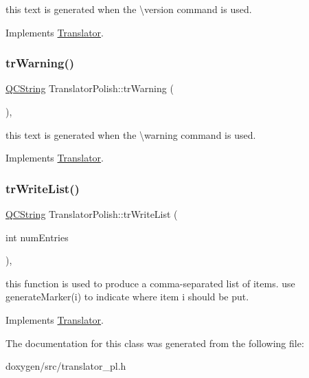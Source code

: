this text is generated when the \textbackslash{}version command is used. 

Implements \mbox{\hyperlink{class_translator}{Translator}}.

\mbox{\label{class_translator_polish_ac2c102476e3c367afb549e97883f5df1}} 
\subsubsection{\texorpdfstring{trWarning()}{trWarning()}}
{\footnotesize\ttfamily \mbox{\hyperlink{class_q_c_string}{Q\+C\+String}} Translator\+Polish\+::tr\+Warning (\begin{DoxyParamCaption}{ }\end{DoxyParamCaption})\hspace{0.3cm}{\ttfamily [inline]}, {\ttfamily [virtual]}}

this text is generated when the \textbackslash{}warning command is used. 

Implements \mbox{\hyperlink{class_translator}{Translator}}.

\mbox{\label{class_translator_polish_ac620731bc7c549f184826d9e558db0aa}} 
\subsubsection{\texorpdfstring{trWriteList()}{trWriteList()}}
{\footnotesize\ttfamily \mbox{\hyperlink{class_q_c_string}{Q\+C\+String}} Translator\+Polish\+::tr\+Write\+List (\begin{DoxyParamCaption}\item[{int}]{num\+Entries }\end{DoxyParamCaption})\hspace{0.3cm}{\ttfamily [inline]}, {\ttfamily [virtual]}}

this function is used to produce a comma-\/separated list of items. use generate\+Marker(i) to indicate where item i should be put. 

Implements \mbox{\hyperlink{class_translator}{Translator}}.



The documentation for this class was generated from the following file\+:\begin{DoxyCompactItemize}
\item 
doxygen/src/translator\+\_\+pl.\+h\end{DoxyCompactItemize}
